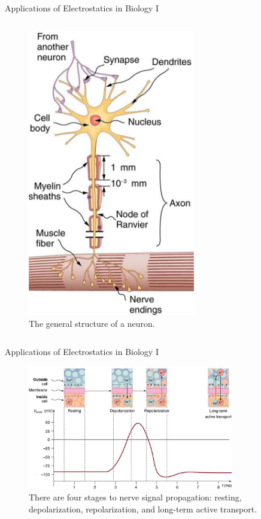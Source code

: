 \documentclass{beamer}
\begin{document}
\begin{frame}{Applications of Electrostatics in Biology I}
\begin{columns}[T]
\begin{column}{0.5\textwidth}
\begin{figure}
\includegraphics[width=0.65\textwidth]{figures/neuron.png}
\caption{\label{fig:nerve_b} The general structure of a neuron.}
\end{figure}
\end{column}
\end{columns}
\end{frame}

\begin{frame}{Applications of Electrostatics in Biology I}
\begin{figure}
\centering
\includegraphics[width=0.8\textwidth]{figures/cell_wall_graph.png}
\caption{\label{fig:nerve2} There are four stages to nerve signal propagation: resting, depolarization, repolarization, and long-term active transport.}
\end{figure}
\end{frame}
\end{document}
